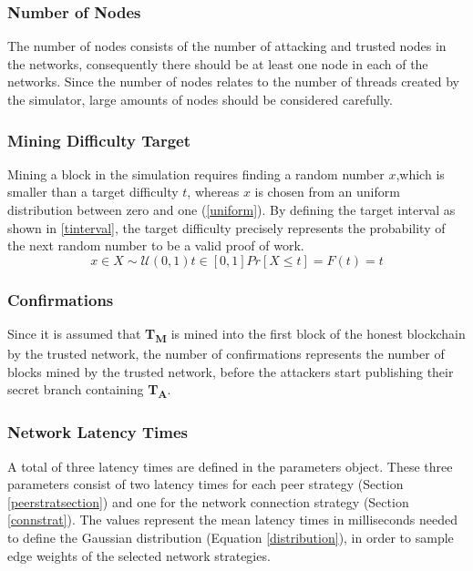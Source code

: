 \documentclass[a4paper,12pt,twoside]{report}
\begin{document}
\subsubsection{Number of Nodes}
The number of nodes consists of the number of attacking and trusted nodes in the networks, consequently there should be at least one node in each of the networks. Since the number of nodes relates to the number of threads created by the simulator, large amounts of nodes should be considered carefully.
\subsubsection{Mining Difficulty Target}
Mining a block in the simulation requires finding a random number $x$,which is smaller than a target difficulty $t$, whereas $x$ is chosen from an uniform distribution between zero and one (\autoref{uniform}). By defining the target interval as shown in \autoref{tinterval}, the target difficulty precisely represents the probability of the next random number to be a valid proof of work.
\begin{subequations}
\begin{equation}\label{uniform}
x \in X\sim \mathcal{U}(0,1)
\end{equation}
\begin{equation}\label{tinterval}
t \in [0,1]
\end{equation}
\begin{equation}\label{probability}
Pr[X \leq t] = F(t) = t
\end{equation}
\end{subequations}
\subsubsection{Confirmations}
Since it is assumed that \textbf{T\textsubscript{M}} is mined into the first block of the honest blockchain by the trusted network, the number of confirmations represents the number of blocks mined by the trusted network, before the attackers start publishing their secret branch containing \textbf{T\textsubscript{A}}.
\subsubsection{Network Latency Times}
A total of three latency times are defined in the parameters object. These three parameters consist of two latency times for each peer strategy (Section \ref{peerstratsection}) and one for the network connection strategy (Section \ref{connstrat}). The values represent the mean latency times in milliseconds needed to define the Gaussian distribution (Equation \ref{distribution}), in order to sample edge weights of the selected network strategies.
\end{document}

